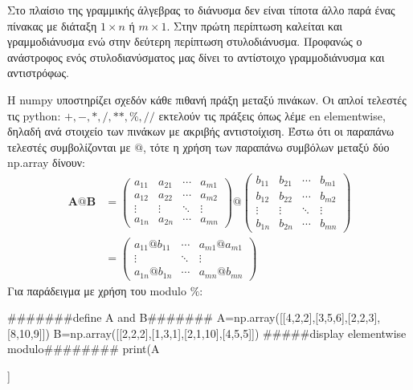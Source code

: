 Στο πλαίσιο της γραμμικής άλγεβρας το διάνυσμα δεν είναι τίποτα άλλο παρά ένας πίνακας με διάταξη $1 \times n$ ή $m \times 1$. Στην πρώτη περίπτωση καλείται και γραμμοδιάνυσμα ενώ στην δεύτερη περίπτωση στυλοδιάνυσμα. Προφανώς ο ανάστροφος ενός στυλοδιανύσματος μας δίνει το αντίστοιχο γραμμοδιάνυσμα και αντιστρόφως.

Η {\en numpy} υποστηρίζει σχεδόν κάθε πιθανή πράξη μεταξύ πινάκων. Οι απλοί τελεστές τις python: $+,-,*,/,**,\%,//$ εκτελούν τις πράξεις όπως λέμε {en elementwise}, δηλαδή ανά στοιχείο των πινάκων με ακριβής αντιστοίχιση. Έστω ότι οι παραπάνω τελεστές συμβολίζονται με $ @ $, τότε η χρήση των παραπάνω συμβόλων μεταξύ δύο {\en np.array} δίνουν: 
\begin{align}
{\mathbf{A}}@{\mathbf{B}}&=\left(\begin{array}{cccc}
a_{11} & a_{21} & \cdots & a_{m 1} \\
a_{12} & a_{22} & \cdots & a_{m 2} \\
\vdots & \vdots & \ddots & \vdots \\
a_{1 n} & a_{2 n} & \cdots & a_{m n}
\end{array}\right) @ \left(\begin{array}{cccc}
b_{11} & b_{21} & \cdots & b_{m 1} \\
b_{12} & b_{22} & \cdots & b_{m 2} \\
\vdots & \vdots & \ddots & \vdots \\
b_{1 n} & b_{2 n} & \cdots & b_{m n}
\end{array}\right)\\&=\left(\begin{array}{cccc}
a_{11}@b_{11} & \cdots & a_{m 1}@a_{m 1} \\
\vdots  & \ddots & \vdots \\
a_{1 n}@b_{1 n} & \cdots & a_{m n}@b_{m n}
\end{array}\right)
\end{align}
Για παράδειγμα με χρήση του {\en modulo} $\%$:
\en
\begin{python}
#######define A and B#######
A=np.array([[4,2,2],[3,5,6],[2,2,3],[8,10,9]])
B=np.array([[2,2,2],[1,3,1],[2,1,10],[4,5,5]])
#####display elementwise modulo########
print(A%
\end{python}
\vspace*{-0.7cm}
\begin{codeout}
[[0 0 0]
 [0 2 0]
 [0 0 3]
 [0 0 4]]
\end{codeout}
\gr

